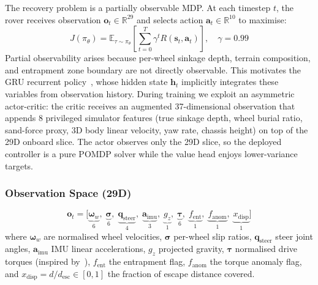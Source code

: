 \documentclass[conference]{IEEEtran}
\begin{document}
The recovery problem is a partially observable MDP. At each timestep $t$, the
rover receives observation $\mathbf{o}_t \in \mathbb{R}^{29}$ and selects action
$\mathbf{a}_t \in \mathbb{R}^{10}$ to maximise:
\begin{equation}
  J(\pi_\theta) = \mathbb{E}_{\tau \sim \pi_\theta}
  \!\left[ \sum_{t=0}^{T} \gamma^t R(\mathbf{s}_t, \mathbf{a}_t) \right],
  \quad \gamma = 0.99
  \label{eq:objective}
\end{equation}
Partial observability arises because per-wheel sinkage depth, terrain composition,
and entrapment zone boundary are not directly observable. This motivates the GRU
recurrent policy~\cite{cho2014gru}, whose hidden state $\mathbf{h}_t$ implicitly
integrates these variables from observation history. During training we exploit an asymmetric actor-critic: the critic receives an
augmented 37-dimensional observation that appends 8 privileged simulator features
(true sinkage depth, wheel burial ratio, sand-force proxy, 3D body linear
velocity, yaw rate, chassis height) on top of the 29D onboard slice. The actor
observes only the 29D slice, so the deployed controller is a pure POMDP solver
while the value head enjoys lower-variance targets.

\subsubsection{Observation Space (29D)}
\begin{equation*}
  \mathbf{o}_t = \bigl[\underbrace{\boldsymbol{\omega}_w}_{6},\;
                        \underbrace{\boldsymbol{\sigma}}_{6},\;
                        \underbrace{\mathbf{q}_{\text{steer}}}_{4},\;
                        \underbrace{\mathbf{a}_{\text{imu}}}_{3},\;
                        \underbrace{g_z}_{1},\;
                        \underbrace{\boldsymbol{\tau}}_{6},\;
                        \underbrace{f_{\text{ent}}}_{1},\;
                        \underbrace{f_{\text{anom}}}_{1},\;
                        \underbrace{x_{\text{disp}}}_{1}\bigr]
\end{equation*}
where $\boldsymbol{\omega}_w$ are normalised wheel velocities, $\boldsymbol{\sigma}$
per-wheel slip ratios, $\mathbf{q}_{\text{steer}}$ steer joint angles,
$\mathbf{a}_{\text{imu}}$ IMU linear accelerations, $g_z$ projected gravity,
$\boldsymbol{\tau}$ normalised drive torques (inspired by~\cite{bi2026escape}),
$f_\text{ent}$ the entrapment flag, $f_\text{anom}$ the torque anomaly flag, and
$x_\text{disp} = d/d_\text{esc} \in [0,1]$ the fraction of escape distance
covered.
\end{document}
